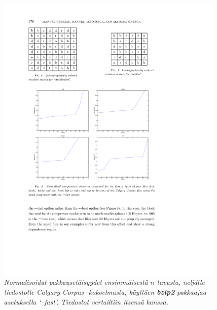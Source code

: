 \documentclass[12pt,finnish]{tktltiki2}
\theoremstyle{definition}
\theoremstyle{remark}
\begin{document}
    \begin{figure}[tb]
      \includegraphics[width=\textwidth]{img/bzip2-fast}
      \caption{\emph{Normalisoidut pakkausetäisyydet ensimmäisestä $n$ tavusta, neljälle tiedostolle Calgary Corpus -kokoelmasta, käyttäen \textbf{bzip2} pakkaajaa asetuksella `--fast'. Tiedostot vertailtiin itsensä kanssa.} \cite{cebrian2005common}}
      \label{fig:bzip2-fast}
    \end{figure}
\end{document}
